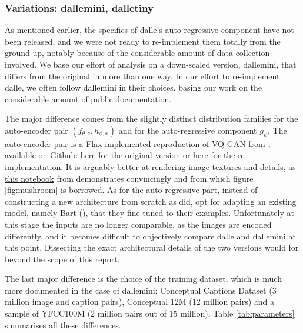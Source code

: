 \documentclass{article}
\begin{document}
\begin{multicols}{2}
\subsubsection{Variations: \gls{dallemini}, \gls{dalletiny}}

As mentioned earlier, the specifics of \gls{dalle}'s auto-regressive component have not been released, and we were not ready to re-implement them totally from the ground up, notably because of the considerable amount of data collection involved. We base our effort of analysis on a down-scaled version, \gls{dallemini}, that differs from the original in more than one way. In our effort to re-implement \gls{dalle}, we often follow \gls{dallemini} in their choices, basing our work on the considerable amount of public documentation.

The major difference comes from the slightly distinct distribution families for the auto-encoder pair $(f_{\theta,z}, h_{\phi,x})$ and for the auto-regressive component $g_\psi$. The auto-encoder pair is a Flax-implemented reproduction of VQ-GAN from \cite{tamingtransfo}, available on Github: \href{https://github.com/CompVis/taming-transformers for the original}{here} for the original version or \href{https://github.com/patil-suraj/vqgan-jax}{here} for the re-implementation. It is arguably better at rendering image textures and details, as \href{https://colab.research.google.com/github/CompVis/taming-transformers/blob/master/scripts/reconstruction_usage.ipynb}{this notebook} from \citeauthor{tamingtransfo} demonstrates convincingly and from which figure \ref{fig:mushroom} is borrowed. As for the auto-regressive part, instead of constructing a new architecture from scratch as \citeauthor{zeroshot} did, \citeauthor{dalleminigit} opt for adapting an existing model, namely Bart (\cite{bart}), that they fine-tuned to their examples. Unfortunately at this stage the inputs are no longer comparable, as the images are encoded differently, and it becomes difficult to objectively compare \gls{dalle} and \gls{dallemini} at this point. Dissecting the exact architectural details of the two versions would for beyond the scope of this report.

The last major difference is the choice of the training dataset, which is much more documented in the case of \gls{dallemini}: Conceptual Captions Dataset (3 million image and caption pairs), Conceptual 12M (12 million pairs) and a sample of YFCC100M (2 million pairs out of 15 million). Table \ref{tab:parameters} summarises all these differences.

\end{multicols}
\end{document}
